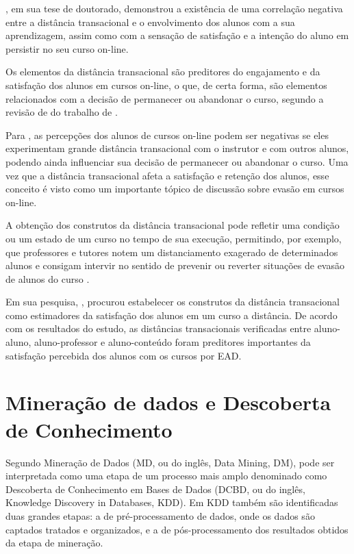 , em sua tese de doutorado, demonstrou a
existência de uma correlação negativa entre a distância transacional e o
envolvimento dos alunos com a sua aprendizagem, assim como com a sensação de
satisfação e a intenção do aluno em persistir no seu curso on-line.

Os elementos da distância transacional são preditores do engajamento e da
satisfação dos alunos em cursos on-line, o que, de certa forma, são elementos
relacionados com a decisão de permanecer ou abandonar o curso, segundo a revisão
de  do trabalho de
.

Para , as percepções dos alunos de cursos
on-line podem ser negativas se eles experimentam grande distância transacional
com o instrutor e com outros alunos, podendo ainda influenciar sua decisão de
permanecer ou abandonar o curso. Uma vez que a distância transacional afeta a
satisfação e retenção dos alunos, esse conceito é visto como um importante
tópico de discussão sobre evasão em cursos on-line.

A obtenção dos construtos da distância transacional pode refletir uma condição
ou um estado de um curso no tempo de sua execução, permitindo, por exemplo, que
professores e tutores notem um distanciamento exagerado de determinados alunos e
consigam intervir no sentido de prevenir ou reverter situações de evasão de
alunos do curso \cite{horzum2011developing}.

Em sua pesquisa, , procurou estabelecer os
construtos da distância transacional como estimadores da satisfação dos alunos
em um curso a distância. De acordo com os resultados do estudo, as distâncias
transacionais verificadas entre aluno-aluno, aluno-professor e aluno-conteúdo
foram preditores importantes da satisfação percebida dos alunos com os cursos
por EAD.

\section{Mineração de dados e Descoberta de Conhecimento}

Segundo  Mineração de Dados (MD, ou do inglês,
Data Mining, DM), pode ser interpretada como uma etapa de um processo mais amplo
denominado como Descoberta de Conhecimento em Bases de Dados (DCBD, ou do
inglês, Knowledge Discovery in Databases, KDD). Em KDD também são identificadas
duas grandes etapas: a de pré-processamento de dados, onde os dados são captados
tratados e organizados, e a de pós-processamento dos resultados obtidos da etapa
de mineração.


